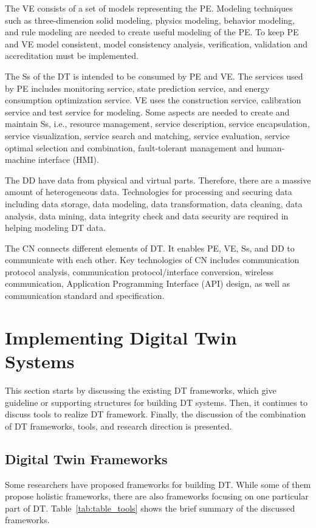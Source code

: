 \documentclass[article,table]{aaltoseries}
\begin{document}
The VE consists of a set of models representing the PE. Modeling techniques such as three-dimension solid modeling, physics modeling, behavior modeling, and rule modeling are needed to create useful modeling of the PE. To keep PE and VE model consistent, model consistency analysis, verification, validation and accreditation must be implemented.

The Ss of the DT is intended to be consumed by PE and VE. The services used by PE includes monitoring service, state prediction service, and energy consumption optimization service. VE uses the construction service, calibration service and test service for modeling. Some aspects are needed to create and maintain Ss, i.e., resource management, service description, service encapsulation, service visualization, service search and matching, service evaluation, service optimal selection and combination, fault-tolerant management and human-machine interface (HMI).

The DD have data from physical and virtual parts. Therefore, there are a massive amount of heterogeneous data. Technologies for processing and securing data including data storage, data modeling, data transformation, data cleaning, data analysis, data mining, data integrity check and data security are required in helping modeling DT data.

The CN connects different elements of DT. It enables PE, VE, Ss, and DD to communicate with each other. Key technologies of CN includes communication protocol analysis, communication protocol/interface conversion, wireless communication, Application Programming Interface (API) design, as well as communication standard and specification.

\section{Implementing Digital Twin Systems}
This section starts by discussing the existing DT frameworks, which give guideline or supporting structures for building DT systems. Then, it continues to discuss tools to realize DT framework. Finally, the discussion of the combination of DT frameworks, tools, and research direction is presented.

\subsection{Digital Twin Frameworks}
Some researchers have proposed frameworks for building DT. While some of them propose holistic frameworks, there are also frameworks focusing on one particular part of DT. Table~\ref{tab:table_tools} shows the brief summary of the discussed frameworks.
\end{document}
